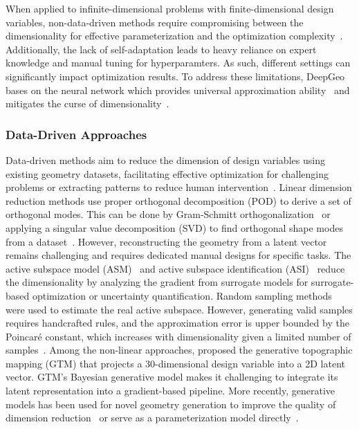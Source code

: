 When applied to infinite-dimensional problems with finite-dimensional design variables, non-data-driven methods require compromising between the dimensionality for effective parameterization and the optimization complexity~\cite{aa.Ceze2009}. Additionally, the lack of self-adaptation leads to heavy reliance on expert knowledge and manual tuning for hyperparamters. As such, different settings can significantly impact optimization results. To address these limitations, DeepGeo bases on the neural network which provides universal approximation ability~\cite{ai.Barron1993} and mitigates the curse of dimensionality~\cite{ai.Barron1993,ai.Poggio2017}.

\subsubsection{Data-Driven Approaches}

Data-driven methods aim to reduce the dimension of design variables using existing geometry datasets, facilitating effective optimization for challenging problems or extracting patterns to reduce human intervention~\cite{aa.Li2022b}. Linear dimension reduction methods use proper orthogonal decomposition (POD) to derive a set of orthogonal modes. This can be done by Gram-Schmitt orthogonalization~\cite{aa.Robinson2001} or applying a singular value decomposition (SVD) to find orthogonal shape modes from a dataset~\cite{aa.Poole2015,aa.Li2019,aa.Kedward2020}. However, reconstructing the geometry from a latent vector remains challenging and requires dedicated manual designs for specific tasks. The active subspace model (ASM)~\cite{aa.Constantine2014,aa.Li2019b,aa.Lukaczyk2014,aa.Namura2017,aa.Grey2018} and active subspace identification (ASI)~\cite{aa.Bauerheim2016} reduce the dimensionality by analyzing the gradient from surrogate models for surrogate-based optimization or uncertainty quantification. Random sampling methods were used to estimate the real active subspace. However, generating valid samples requires handcrafted rules, and the approximation error is upper bounded by the Poincar\'{e} constant, which increases with dimensionality given a limited number of samples~\cite{ai.Payne1960,ai.Beyer1999}. Among the non-linear approaches, \citet{aa.Viswanath2011} proposed the generative topographic mapping (GTM) that projects a 30-dimensional design variable into a 2D latent vector. GTM's Bayesian generative model makes it challenging to integrate its latent representation into a gradient-based pipeline. More recently, generative models has been used for novel geometry generation \cite{aa.Achour2020,aa.Chen2020,aa.Li2020,aa.Li2021,aa.Wei2024,aa.Yang2024} to improve the quality of dimension reduction~\cite{aa.Li2020,aa.Li2021} or serve as a parameterization model directly~\cite{aa.Achour2020,aa.Chen2020}.

